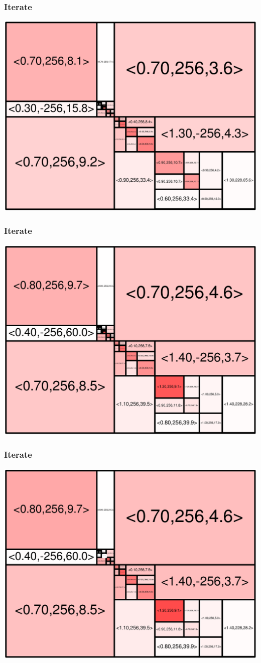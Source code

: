 \begin{frame}
\frametitle{Iterate}\begin{centering}\includegraphics[width=8.5 cm]{remy-graph/graph/test42.pdf}

\end{centering}\end{frame}


\begin{frame}
\frametitle{Iterate}\begin{centering}\includegraphics[width=8.5 cm]{remy-graph/graph/test43.pdf}

\end{centering}\end{frame}


\begin{frame}
\frametitle{Iterate}\begin{centering}\includegraphics[width=8.5 cm]{remy-graph/graph/test44.pdf}

\end{centering}\end{frame}


